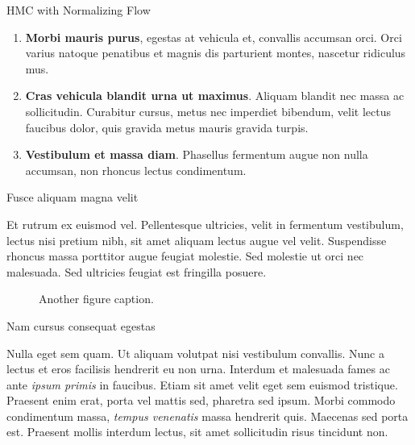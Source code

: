 \documentclass[final]{beamer}
\newlength{\colwidth}
\begin{document}
\begin{frame}[t]
\begin{columns}[t]
\begin{column}{\colwidth}
\begin{block}{HMC with Normalizing Flow}
    \begin{enumerate}
      \item \textbf{Morbi mauris purus}, egestas at vehicula et, convallis
        accumsan orci. Orci varius natoque penatibus et magnis dis parturient
        montes, nascetur ridiculus mus.
      \item \textbf{Cras vehicula blandit urna ut maximus}. Aliquam blandit nec
        massa ac sollicitudin. Curabitur cursus, metus nec imperdiet bibendum,
        velit lectus faucibus dolor, quis gravida metus mauris gravida turpis.
      \item \textbf{Vestibulum et massa diam}. Phasellus fermentum augue non
        nulla accumsan, non rhoncus lectus condimentum.
    \end{enumerate}

  \end{block}

  \begin{block}{Fusce aliquam magna velit}

    Et rutrum ex euismod vel. Pellentesque ultricies, velit in fermentum
    vestibulum, lectus nisi pretium nibh, sit amet aliquam lectus augue vel
    velit. Suspendisse rhoncus massa porttitor augue feugiat molestie. Sed
    molestie ut orci nec malesuada. Sed ultricies feugiat est fringilla
    posuere.

    \begin{figure}
      \centering
      \caption{Another figure caption.}
    \end{figure}

  \end{block}

  \begin{block}{Nam cursus consequat egestas}

    Nulla eget sem quam. Ut aliquam volutpat nisi vestibulum convallis. Nunc a
    lectus et eros facilisis hendrerit eu non urna. Interdum et malesuada fames
    ac ante \textit{ipsum primis} in faucibus. Etiam sit amet velit eget sem
    euismod tristique. Praesent enim erat, porta vel mattis sed, pharetra sed
    ipsum. Morbi commodo condimentum massa, \textit{tempus venenatis} massa
    hendrerit quis. Maecenas sed porta est. Praesent mollis interdum lectus,
    sit amet sollicitudin risus tincidunt non.


\end{block}
\end{column}
\end{columns}
\end{frame}
\end{document}
